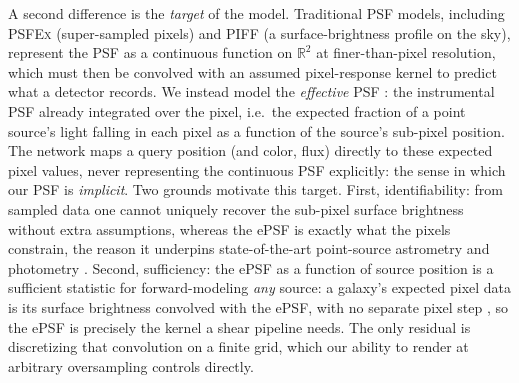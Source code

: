 \documentclass[twocolumn]{aastex701}
\begin{document}
A second difference is the \emph{target} of the model. Traditional
PSF models, including \textsc{PSFEx} (super-sampled pixels) and \textsc{PIFF} (a
surface-brightness profile on the sky), represent the PSF as a continuous function on
$\mathbb{R}^2$ at finer-than-pixel resolution, which must then be convolved with an
assumed pixel-response kernel to predict what a detector records. We instead model the
\emph{effective} PSF \citep[ePSF;][]{AndersonKing2000}: the instrumental PSF already
integrated over the pixel, i.e.\ the expected fraction of a point source's light falling
in each pixel as a function of the source's sub-pixel position. The network maps a query
position (and color, flux) directly to these expected pixel values, never representing
the continuous PSF explicitly: the sense in which our PSF is \emph{implicit}. Two grounds
motivate this target. First, identifiability: from sampled data one
cannot uniquely recover the sub-pixel surface brightness without extra assumptions,
whereas the ePSF is exactly what the pixels constrain, the reason it underpins
state-of-the-art point-source astrometry and photometry \citep{AndersonKing2000,
Lauer1999, Liaudat2023}. Second, sufficiency: the ePSF as a function of source position
is a sufficient statistic for forward-modeling \emph{any} source: a galaxy's expected
pixel data is its surface brightness convolved with the ePSF, with no separate pixel
step \citep{BernsteinJarvis2002}, so the ePSF is precisely the kernel a shear pipeline
needs. The only residual is discretizing that convolution on a finite grid, which our
ability to render at arbitrary oversampling controls directly.
\end{document}
